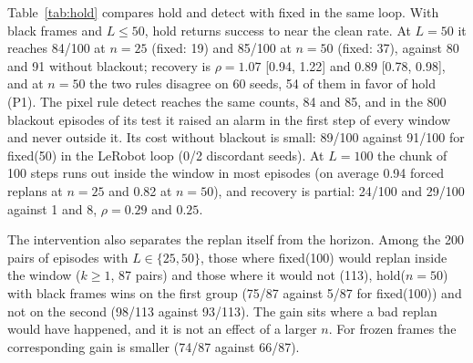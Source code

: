 \documentclass[11pt]{article}
\newcommand{\hold}{\textsf{hold}\xspace}
\newcommand{\fixed}{\textsf{fixed}\xspace}
\newcommand{\detect}{\textsf{detect}\xspace}
\begin{document}
Table~\ref{tab:hold} compares \hold and \detect with \fixed in the same loop. With black frames and $L\le50$, \hold returns success to near the clean rate. At $L{=}50$ it reaches 84/100 at $n{=}25$ (\fixed: 19) and 85/100 at $n{=}50$ (\fixed: 37), against 80 and 91 without blackout; recovery is $\rho=1.07$ [0.94, 1.22] and $0.89$ [0.78, 0.98], and at $n{=}50$ the two rules disagree on 60 seeds, 54 of them in favor of hold (P1). The pixel rule \detect reaches the same counts, 84 and 85, and in the 800 blackout episodes of its test it raised an alarm in the first step of every window and never outside it. Its cost without blackout is small: 89/100 against 91/100 for \fixed(50) in the LeRobot loop (0/2 discordant seeds). At $L{=}100$ the chunk of 100 steps runs out inside the window in most episodes (on average 0.94 forced replans at $n{=}25$ and 0.82 at $n{=}50$), and recovery is partial: 24/100 and 29/100 against 1 and 8, $\rho=0.29$ and $0.25$.

\begin{table}[t]
\centering\small
\resizebox{\textwidth}{!}{}
\caption{TC, \fixed against \hold and \detect on one loop; the clean column, and so the denominator of $\rho$, comes from the LeRobot loop. Counts are successes out of 100. $\rho$ is recovery (Eq.~\ref{eq:rho}) with 95\% bootstrap interval; ``n/r'': denominator below 0.10; $^*$: more than 5\% of the bootstrap resamples had a denominator below 0.10. hold/fixed: seeds where only hold / only fixed succeeds.}
\label{tab:hold}
\end{table}

The intervention also separates the replan itself from the horizon. Among the 200 pairs of episodes with $L\in\{25,50\}$, those where \fixed(100) would replan inside the window ($k{\ge}1$, 87 pairs) and those where it would not (113), \hold($n{=}50$) with black frames wins on the first group (75/87 against 5/87 for \fixed(100)) and not on the second (98/113 against 93/113). The gain sits where a bad replan would have happened, and it is not an effect of a larger $n$. For frozen frames the corresponding gain is smaller (74/87 against 66/87).
\end{document}
